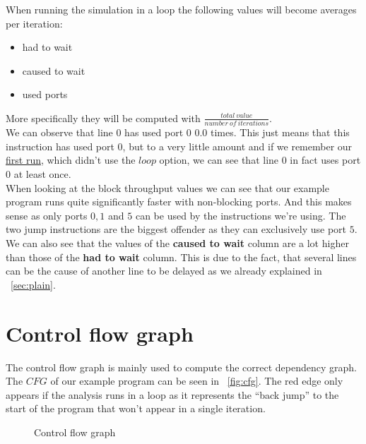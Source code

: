 \documentclass[a4paper,12pt,titlepage, twoside]{report}
\begin{document}
When running the simulation in a loop the following values will become averages per iteration:

\begin{itemize}
    \item had to wait
    \item caused to wait
    \item used ports
\end{itemize} 

More specifically they will be computed with $\frac{total\ value}{number\ of\ iterations}$.\\
We can observe that line $0$ has used port $0$ $0.0$ times. This just means that this instruction has used port $0$, but to a very little amount and if we remember our \hyperref[sec:plain]{first run}, which didn't use the $loop$ option, we can see that line $0$ in fact uses port $0$ at least once.\\
When looking at the block throughput values we can see that our example program runs quite significantly faster with non-blocking ports. And this makes sense as only ports $0, 1$ and $5$ can be used by the instructions we're using. The two jump instructions are the biggest offender as they can exclusively use port $5$.\\
We can also see that the values of the \textbf{caused to wait} column are a lot higher than those of the \textbf{had to wait} column. This is due to the fact, that several lines can be the cause of another line to be delayed as we already explained in ~\autoref{sec:plain}.


\section{Control flow graph}
The control flow graph is mainly used to compute the correct dependency graph. The $CFG$ of our example program can be seen in ~\autoref{fig:cfg}. The red edge only appears if the analysis runs in a loop as it represents the ``back jump'' to the start of the program that won't appear in a single iteration.

\begin{figure}
    \centering
    \caption{Control flow graph}
    \label{fig:cfg}
\end{figure}
\end{document}
